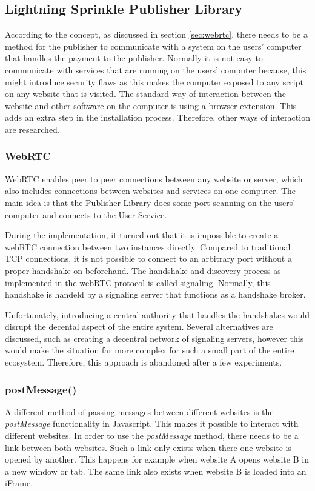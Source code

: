 \subsection{Lightning Sprinkle Publisher Library}
According to the concept, as discussed in section \ref{sec:webrtc}, there needs to be a method for the publisher to communicate with a system on the users' computer that handles the payment to the publisher. Normally it is not easy to communicate with services that are running on the users' computer because, this might introduce security flaws as this makes the computer exposed to any script on any website that is visited. The standard way of interaction between the website and other software on the computer is using a browser extension. This adds an extra step in the installation process. Therefore, other ways of interaction are researched.

\subsubsection{WebRTC}

WebRTC enables peer to peer connections between any website or server, which also includes connections between websites and services on one computer. The main idea is that the Publisher Library does some port scanning on the users' computer and connects to the User Service.

During the implementation, it turned out that it is impossible to create a webRTC connection between two instances directly. Compared to traditional TCP connections, it is not possible to connect to an arbitrary port without a proper handshake on beforehand. The handshake and discovery process as implemented in the webRTC protocol is called signaling. Normally, this handshake is handeld by a signaling server that functions as a handshake broker.

Unfortunately, introducing a central authority that handles the handshakes would disrupt the decental aspect of the entire system. Several alternatives are discussed, such as creating a decentral network of signaling servers, however this would make the situation far more complex for such a small part of the entire ecosystem. Therefore, this approach is abandoned after a few experiments.

\subsubsection{postMessage()}
A different method of passing messages between different websites is the \textit{postMessage} functionality in Javascript. This makes it possible to interact with different websites. In order to use the \textit{postMessage} method, there needs to be a link between both websites. Such a link only exists when there one website is opened by another. This happens for example when website A opens website B in a new window or tab. The same link also exists when website B is loaded into an iFrame. 

